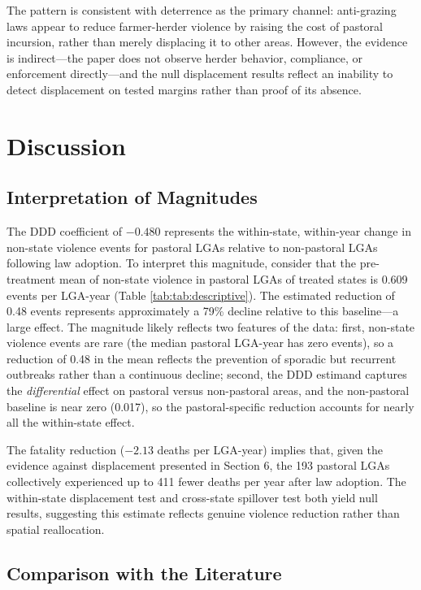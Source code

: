 \documentclass[12pt]{article}
\begin{document}
The pattern is consistent with deterrence as the primary channel: anti-grazing laws appear to reduce farmer-herder violence by raising the cost of pastoral incursion, rather than merely displacing it to other areas. However, the evidence is indirect---the paper does not observe herder behavior, compliance, or enforcement directly---and the null displacement results reflect an inability to detect displacement on tested margins rather than proof of its absence.


\section{Discussion}

\subsection{Interpretation of Magnitudes}

The DDD coefficient of $-0.480$ represents the within-state, within-year change in non-state violence events for pastoral LGAs relative to non-pastoral LGAs following law adoption. To interpret this magnitude, consider that the pre-treatment mean of non-state violence in pastoral LGAs of treated states is 0.609 events per LGA-year (Table \ref{tab:tab:descriptive}). The estimated reduction of 0.48 events represents approximately a 79\% decline relative to this baseline---a large effect. The magnitude likely reflects two features of the data: first, non-state violence events are rare (the median pastoral LGA-year has zero events), so a reduction of 0.48 in the mean reflects the prevention of sporadic but recurrent outbreaks rather than a continuous decline; second, the DDD estimand captures the \textit{differential} effect on pastoral versus non-pastoral areas, and the non-pastoral baseline is near zero (0.017), so the pastoral-specific reduction accounts for nearly all the within-state effect.

The fatality reduction ($-2.13$ deaths per LGA-year) implies that, given the evidence against displacement presented in Section 6, the 193 pastoral LGAs collectively experienced up to 411 fewer deaths per year after law adoption. The within-state displacement test and cross-state spillover test both yield null results, suggesting this estimate reflects genuine violence reduction rather than spatial reallocation.

\subsection{Comparison with the Literature}
\end{document}
